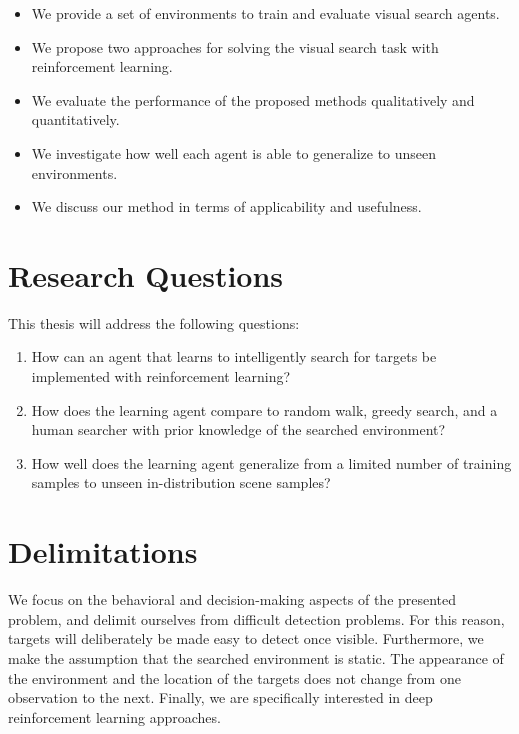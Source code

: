 \begin{itemize}
  \item We provide a set of environments to train and evaluate visual search agents.
  \item We propose two approaches for solving the visual search task with reinforcement learning.
  \item We evaluate the performance of the proposed methods qualitatively and quantitatively.
  \item We investigate how well each agent is able to generalize to unseen environments.
  \item We discuss our method in terms of applicability and usefulness.
\end{itemize}

\section{Research Questions}
\label{sec:questions}

This thesis will address the following questions:

\begin{enumerate}
  \item \label{itm:rq1} How can an agent that learns to intelligently search for targets be implemented with reinforcement learning?
  \item \label{itm:rq2} How does the learning agent compare to random walk, greedy search, and a human searcher with prior knowledge of the searched environment?
  \item \label{itm:rq3} How well does the learning agent generalize from a limited number of training samples to unseen in-distribution scene samples?
\end{enumerate}

\section{Delimitations}
\label{sec:delimitations}

We focus on the behavioral and decision-making aspects of the presented problem, and delimit ourselves from difficult detection problems.
For this reason, targets will deliberately be made easy to detect once visible.
Furthermore, we make the assumption that the searched environment is static.
The appearance of the environment and the location of the targets does not change from one observation to the next.
Finally, we are specifically interested in deep reinforcement learning approaches.

